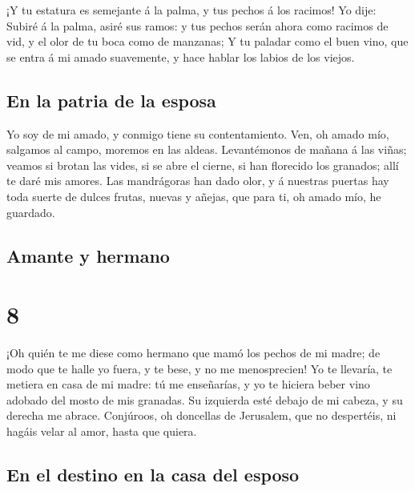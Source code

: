  ¡Y tu estatura es semejante á la palma, y tus pechos á los
racimos!  Yo dije: Subiré á la palma, asiré sus ramos: y tus
pechos serán ahora como racimos de vid, y el olor de tu boca como de
manzanas;  Y tu paladar como el buen vino, que se entra á mi
amado suavemente, y hace hablar los labios de los viejos.

\hypertarget{en-la-patria-de-la-esposa}{%
\subsection{En la patria de la esposa}\label{en-la-patria-de-la-esposa}}

 Yo soy de mi amado, y conmigo tiene su contentamiento.
 Ven, oh amado mío, salgamos al campo, moremos en las
aldeas.  Levantémonos de mañana á las viñas; veamos si
brotan las vides, si se abre el cierne, si han florecido los granados;
allí te daré mis amores.  Las mandrágoras han dado olor, y
á nuestras puertas hay toda suerte de dulces frutas, nuevas y añejas,
que para ti, oh amado mío, he guardado.

\hypertarget{amante-y-hermano}{%
\subsection{Amante y hermano}\label{amante-y-hermano}}

\hypertarget{section-7}{%
\section{8}\label{section-7}}

 ¡Oh quién te me diese como hermano que mamó los pechos de
mi madre; de modo que te halle yo fuera, y te bese, y no me
menosprecien!  Yo te llevaría, te metiera en casa de mi
madre: tú me enseñarías, y yo te hiciera beber vino adobado del mosto de
mis granadas.  Su izquierda esté debajo de mi cabeza, y su
derecha me abrace.  Conjúroos, oh doncellas de Jerusalem,
que no despertéis, ni hagáis velar al amor, hasta que quiera.

\hypertarget{en-el-destino-en-la-casa-del-esposo}{%
\subsection{En el destino en la casa del
esposo}\label{en-el-destino-en-la-casa-del-esposo}}

